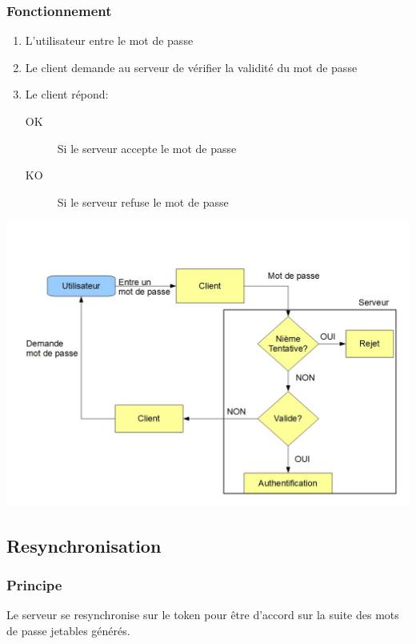 \documentclass{"../../res/univ-projet"}
\begin{document}
\subsubsection{Fonctionnement}
\begin{enumerate}
    \item L'utilisateur entre le mot de passe
    \item Le client demande au serveur de vérifier la validité du
        mot de passe
    \item Le client répond:
        \begin{description}
            \item[OK] Si le serveur accepte le mot de passe
            \item[KO] Si le serveur refuse le mot de passe
        \end{description}
\end{enumerate}
\includegraphics[width=\textwidth]{../graphics/authentification.jpg}

\subsection{Resynchronisation}
\subsubsection{Principe}
Le serveur se resynchronise sur le token pour être d'accord sur la suite des
mots de passe jetables générés.
\end{document}
